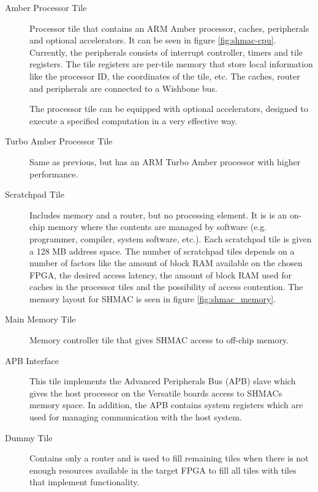 \begin{description}
  \item[Amber Processor Tile] Processor tile that contains an ARM Amber processor, caches, peripherals and optional accelerators.
  It can be seen in figure \ref{fig:shmac-cpu}.
  Currently, the peripherals consists of interrupt controller, timers and tile registers.
  The tile registers are per-tile memory that store local information like the processor ID, the coordinates of the tile, etc. 
  The caches, router and peripherals are connected to a Wishbone bus.
  
%  
  The processor tile can be equipped with optional accelerators, designed to execute a specified computation in a very effective way.
%  
%  
  \item[Turbo Amber Processor Tile] Same as previous, but has an ARM Turbo Amber processor with  higher performance.
  \item[Scratchpad Tile] Includes memory and a router, but no processing element. 
  It is is an on-chip memory where the contents are managed by software (e.g. programmer, compiler, system software, etc.).
  Each scratchpad tile is given a 128 MB address space.
  The number of scratchpad tiles depends on a number of factors like the amount of block RAM available on the chosen FPGA, the desired access latency, the amount of block RAM used for caches in the processor tiles and the possibility of access contention\cite{shmac-plan}.
  The memory layout for SHMAC is seen in figure \ref{fig:shmac_memory}.
  \item[Main Memory Tile] Memory controller tile that gives SHMAC access to off-chip memory.
  \item[APB Interface] This tile implements the Advanced Peripherals Bus (APB) slave which gives the host processor on the Versatile boards access to SHMACs memory space. 
  In addition, the APB contains system registers which are used for managing communication with the host system.
  \item[Dummy Tile] Contains only a router and is used to fill remaining tiles when there is not enough resources available in the target FPGA to fill all tiles with tiles that implement functionality.\end{description}


